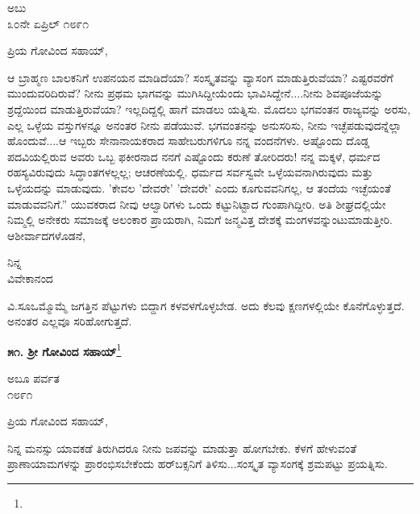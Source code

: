 \begin{flushright}
ಅಬು\\೩೦ನೇ ಏಪ್ರಿಲ್ ೧೮೯೧
\end{flushright}

\noindent
ಪ್ರಿಯ ಗೋವಿಂದ ಸಹಾಯ್,

ಆ ಬ್ರಾಹ್ಮಣ ಬಾಲಕನಿಗೆ ಉಪನಯನ ಮಾಡಿದೆಯಾ? ಸಂಸ್ಕೃತವನ್ನು ವ್ಯಾಸಂಗ ಮಾಡುತ್ತಿರುವೆಯಾ? ಎಷ್ಟರವರೆಗೆ ಮುಂದುವರಿದಿರುವೆ? ನೀನು ಪ್ರಥಮ ಭಾಗವನ್ನು ಮುಗಿಸಿದ್ದೀಯೆಂದು ಭಾವಿಸಿದ್ದೇನೆ....ನೀನು ಶಿವಪೂಜೆಯನ್ನು ಶ್ರದ್ದೆಯಿಂದ ಮಾಡುತ್ತಿರುವೆಯಾ? ಇಲ್ಲದಿದ್ದಲ್ಲಿ ಹಾಗೆ ಮಾಡಲು ಯತ್ನಿಸು. ಮೊದಲು ಭಗವಂತನ ರಾಜ್ಯವನ್ನು ಅರಸು, ಎಲ್ಲ ಒಳ್ಳೆಯ ವಸ್ತುಗಳನ್ನೂ ಅನಂತರ ನೀನು ಪಡೆಯುವೆ. ಭಗವಂತನನ್ನು ಅನುಸರಿಸು, ನೀನು ಇಚ್ಛೆಪಡುವುದನ್ನೆಲ್ಲಾ ಹೊಂದುವೆ....ಆ ಇಬ್ಬರು ಸೇನಾನಾಯಕರಾದ ಸಾಹೇಬರುಗಳಿಗೂ ನನ್ನ ವಂದನೆಗಳು. ಅಷ್ಟೊಂದು ದೊಡ್ಡ ಪದವಿಯಲ್ಲಿರುವ ಅವರು ಒಬ್ಬ ಫಕೀರನಾದ ನನಗೆ ಎಷ್ಟೊಂದು ಕರುಣೆ ತೋರಿದರು! ನನ್ನ ಮಕ್ಕಳೆ, ಧರ್ಮದ ರಹಸ್ಯವಿರುವುದು ಸಿದ್ಧಾಂತಗಳಲ್ಲಲ್ಲ; ಆಚರಣೆಯಲ್ಲಿ. ಧರ್ಮದ ಸರ್ವಸ್ವವೇ ಒಳ್ಳೆಯವನಾಗಿರುವುದು ಮತ್ತು ಒಳ್ಳೆಯದನ್ನು ಮಾಡುವುದು. ’ಕೇವಲ ’ದೇವರೇ’ ’ದೇವರೇ’ ಎಂದು ಕೂಗುವವನಿಗಲ್ಲ, ಆ ತಂದೆಯ ಇಚ್ಛೆಯಂತೆ ಮಾಡುವವನಿಗೆ.” ಯುವಕರಾದ ನೀವು ಆಲ್ವಾರಿಗಳು ಒಂದು ಕಟ್ಟುನಿಟ್ಟಾದ ಗುಂಪಾಗಿದ್ದೀರಿ. ಅತಿ ಶೀಘ್ರದಲ್ಲಿಯೇ ನಿಮ್ಮಲ್ಲಿ ಅನೇಕರು ಸಮಾಜಕ್ಕೆ ಅಲಂಕಾರ ಪ್ರಾಯರಾಗಿ, ನಿಮಗೆ ಜನ್ಮವಿತ್ತ ದೇಶಕ್ಕೆ ಮಂಗಳವನ್ನುಂಟುಮಾಡುತ್ತೀರಿ. ಆಶೀರ್ವಾದಗಳೊಡನೆ,

\vspace{-0.5cm}

{\flushright
ನಿನ್ನ\\ವಿವೇಕಾನಂದ\par}

ವಿ.ಸೂ\enginline{-}ಒಮ್ಮೊಮ್ಮೆ ಜಗತ್ತಿನ ಪೆಟ್ಟುಗಳು ಬಿದ್ದಾಗ ಕಳವಳಗೊಳ್ಳಬೇಡ. ಅದು ಕೆಲವು ಕ್ಷಣಗಳಲ್ಲಿಯೇ ಕೊನೆಗೊಳ್ಳುತ್ತದೆ. ಅನಂತರ ಎಲ್ಲವೂ ಸರಿಹೋಗುತ್ತದೆ.

\begin{center}
\textbf{೫೧. ಶ‍್ರೀ ಗೋವಿಂದ ಸಹಾಯ್}\footnote{}
\end{center}

\vspace{-0.65cm}

\begin{flushright}
ಅಬೂ ಪರ್ವತ\\೧೮೯೧
\end{flushright}

\vspace{-0.55cm}

\noindent
ಪ್ರಿಯ ಗೋವಿಂದ ಸಹಾಯ್,

ನಿನ್ನ ಮನಸ್ಸು ಯಾವಕಡೆ ತಿರುಗಿದರೂ ನೀನು ಜಪವನ್ನು ಮಾಡುತ್ತಾ ಹೋಗಬೇಕು. ಕೆಳಗೆ ಹೇಳುವಂತೆ ಪ್ರಾಣಾಯಾಮಗಳನ್ನು ಪ್ರಾರಂಭಿಸಬೇಕೆಂದು ಹರ್‌ಬಕ್ಸನಿಗೆ ತಿಳಿಸು...ಸಂಸ್ಕೃತ ವ್ಯಾಸಂಗಕ್ಕೆ ಶ್ರಮಪಟ್ಟು ಪ್ರಯತ್ನಿಸು.

\vspace{-0.62cm}

